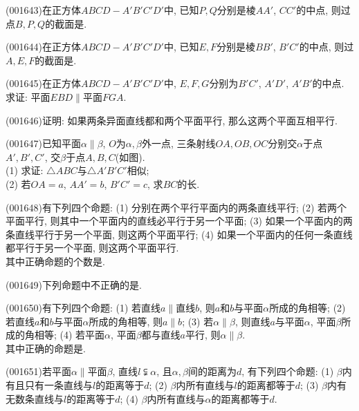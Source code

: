 \item (001643)在正方体$ABCD-A'B'C'D'$中, 已知$P,Q$分别是棱$AA'$, $CC'$的中点, 则过点$B,P,Q$的截面是.\\ 
\item (001644)在正方体$ABCD-A'B'C'D'$中, 已知$E,F$分别是棱$BB'$, $B'C'$的中点, 则过$A,E,F$的截面是.\\ 
\item (001645)在正方体$ABCD-A'B'C'D'$中, $E,F,G$分别为$B'C'$, $A'D'$, $A'B'$的中点. 求证: 平面$EBD\parallel$平面$FGA$.
\item (001646)证明: 如果两条异面直线都和两个平面平行, 那么这两个平面互相平行.
\item (001647)已知平面$\alpha\parallel \beta$, $O$为$\alpha,\beta$外一点, 三条射线$OA,OB,OC$分别交$\alpha$于点$A',B',C'$, 交$\beta$于点$A,B,C$(如图).\\ 
(1) 求证: $\triangle ABC$与$\triangle A'B'C'$相似;\\ 
(2) 若$OA=a$, $AA'=b$, $B'C'=c$, 求$BC$的长.
\item (001648)有下列四个命题: (1) 分别在两个平行平面内的两条直线平行; (2) 若两个平面平行, 则其中一个平面内的直线必平行于另一个平面; (3) 如果一个平面内的两条直线平行于另一个平面, 则这两个平面平行; (4) 如果一个平面内的任何一条直线都平行于另一个平面, 则这两个平面平行.\\ 
其中正确命题的个数是.\\ 
\item (001649)下列命题中不正确的是.\\ 
\item (001650)有下列四个命题: (1) 若直线$a\parallel$直线$b$, 则$a$和$b$与平面$\alpha$所成的角相等; (2) 若直线$a$和$b$与平面$\alpha$所成的角相等, 则$a\parallel b$; (3) 若$\alpha\parallel \beta$, 则直线$a$与平面$\alpha$, 平面$\beta$所成的角相等; (4) 若平面$\alpha$, 平面$\beta$都与直线$a$平行, 则$\alpha\parallel \beta$.\\ 
其中正确的命题是.\\ 
\item (001651)若平面$\alpha\parallel$平面$\beta$, 直线$l\subsetneqq \alpha$, 且$\alpha,\beta$间的距离为$d$, 有下列四个命题: (1) $\beta$内有且只有一条直线与$l$的距离等于$d$; (2) $\beta$内所有直线与$l$的距离都等于$d$; (3) $\beta$内有无数条直线与$l$的距离等于$d$; (4) $\beta$内所有直线与$\alpha$的距离都等于$d$.\\ 
